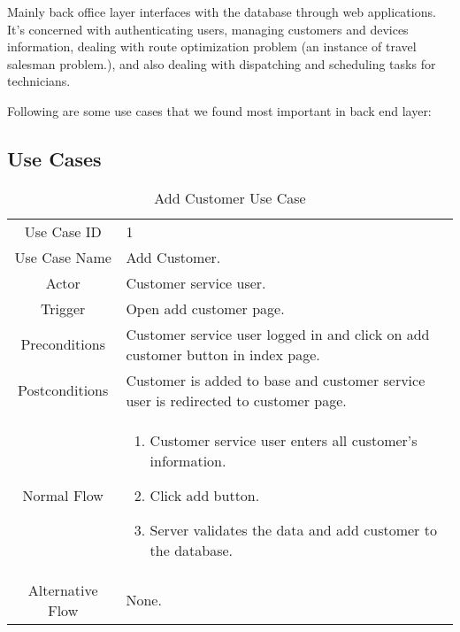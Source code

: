 Mainly back office layer interfaces with the database through web applications. It's concerned with authenticating users, managing customers and devices information, dealing with route optimization problem (an instance of travel salesman problem.), and also dealing with dispatching and scheduling tasks for technicians.


Following are some use cases that we found most important in back end layer:
\subsection{Use Cases}
	\begin{table}[H]
		\centering
		\renewcommand{\arraystretch}{1.5}
		\begin{tabular}[t]{ c  m{10cm} }
			Use Case ID & 1  \\
			Use Case Name & Add Customer. \\
			Actor & Customer service user. \\
			Trigger & Open add customer page. \\
			Preconditions & Customer service user logged in and click on add customer button in index page. \\
			Postconditions & Customer is added to base and customer service user is redirected to customer page. \\
			Normal Flow &\begin{enumerate}
				\item Customer service user enters all customer's information.
				\item Click add button.
				\item Server validates the data and add customer to the database.
			\end{enumerate}\\
			Alternative Flow & None. \\
		\end{tabular}
		\caption{Add Customer Use Case}
		\renewcommand{\arraystretch}{1.0}
	\end{table}
	
